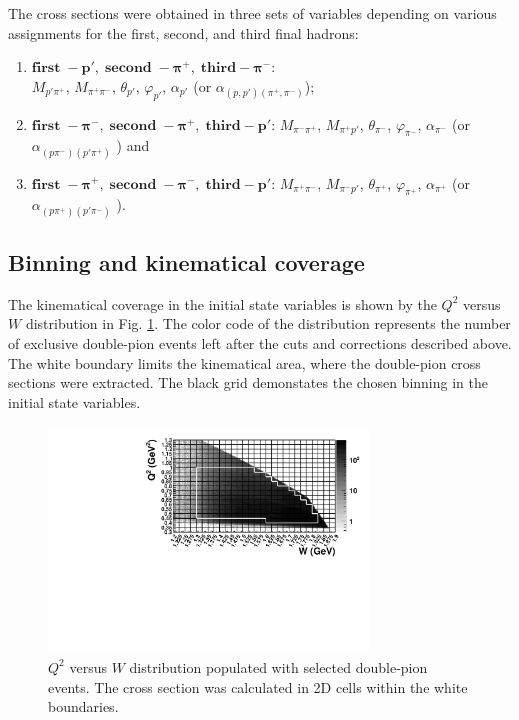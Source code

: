 \documentclass[prc,twocolumn,superscriptaddress,showpacs,amssymb,amsmath,amsfonts,linenumbers,aps]{revtex4-1}
\begin{document}

The cross sections  were obtained in three sets of variables depending on
various assignments for the first, second, and
third final hadrons:

\begin{enumerate}
\item $\boldsymbol{first\; - p',\; second \; - \pi^{+},\; third - \pi^{-}}$: \\ $M_{p'\pi^{+}}$, $M_{\pi^{+}\pi^{-}}$, $\theta_{p'}$, $\varphi_{p'}$,  $\alpha_{p'}$ (or $\alpha_{(p,p')(\pi^{+},\pi^{-})}$);
\item $\boldsymbol{first\; - \pi^{-},\; second \; - \pi^{+},\; third - p'}$: $M_{\pi^{-}\pi^{+}}$, $M_{\pi^{+}p'}$, $\theta_{\pi^{-}}$, $\varphi_{\pi^{-}}$, $\alpha_{\pi^{-}}$ (or $\alpha_{(p\pi^{-})(p'\pi^{+})}$ ) and
\item $\boldsymbol{first\; - \pi^{+},\; second \; - \pi^{-},\; third - p'}$: $M_{\pi^{+}\pi^{-}}$, $M_{\pi^{-}p'}$, $\theta_{\pi^{+}}$, $\varphi_{\pi^{+}}$, $\alpha_{\pi^{+}}$ (or $\alpha_{(p\pi^{+})(p'\pi^{-})}$ ).
\end{enumerate}







\subsection{Binning and kinematical coverage}

The kinematical coverage in the initial state variables is shown by the $Q^{2}$ versus $W$ distribution in Fig. \ref{fig:q2vsw}. The color code of the distribution represents the number of exclusive double-pion events left after the cuts and corrections described above. 
The white boundary limits the kinematical area, where the double-pion cross sections were extracted. The black grid demonstates the chosen binning in the initial state variables. 



\begin{figure}[htp]
\begin{center}
 \includegraphics[width=8.5cm,keepaspectratio]{pictures/binning/q2vsw.pdf} 
\vspace{-0.1cm}
\caption{$Q^2$ versus $W$ distribution populated with selected double-pion events. The cross section was calculated in 2D cells within the white boundaries.}
\label{fig:q2vsw}
\end{center}
\end{figure} 
\end{document}
